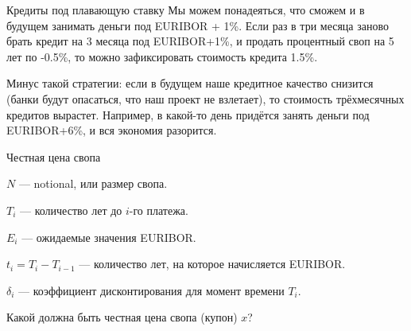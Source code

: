 \documentclass{beamer}
\begin{document}
\begin{frame}{Кредиты под плавающую ставку}
\justify
Мы можем понадеяться, что сможем и в будущем занимать деньги под EURIBOR + 1\%. Если раз в три месяца заново брать кредит на 3 месяца под EURIBOR+1\%, и продать процентный своп на 5 лет по -0.5\%, то можно зафиксировать стоимость кредита 1.5\%.

\justify
Минус такой стратегии: если в будущем наше кредитное качество снизится (банки будут опасаться, что наш проект не взлетает), то стоимость трёхмесячных кредитов вырастет. Например, в какой-то день придётся занять деньги под EURIBOR+6\%, и вся экономия разорится.
\end{frame}



\begin{frame}{Честная цена свопа}
\centering
{}

\justify
$N$ --- notional, или размер свопа.

$T_i$ --- количество лет до $i$-го платежа.

$E_i$ --- ожидаемые значения EURIBOR.

$t_i = T_i - T_{i-1}$ --- количество лет, на которое начисляется EURIBOR.

$\delta_i$ --- коэффициент дисконтирования для момент времени $T_i$.

\justify
Какой должна быть честная цена свопа (купон) $x$?
\end{frame}
\end{document}
